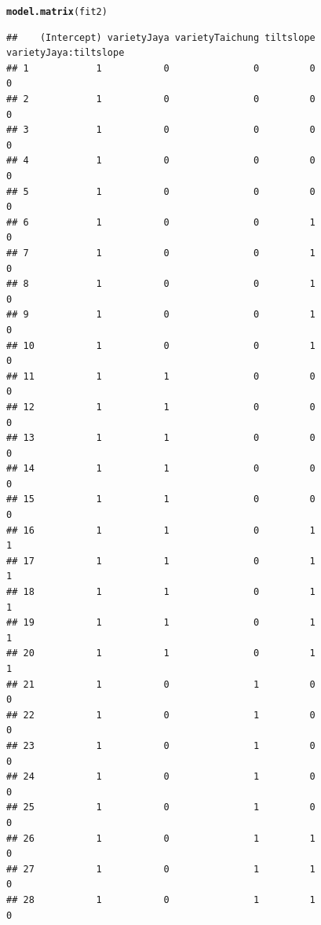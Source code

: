 \documentclass[11pt, a4paper]{article}\usepackage[]{graphicx}\usepackage[dvipsnames]{xcolor}
\makeatletter
\newcommand{\hlstd}[1]{\textcolor[rgb]{0.345,0.345,0.345}{#1}}%
\newcommand{\hlkwd}[1]{\textcolor[rgb]{0.737,0.353,0.396}{\textbf{#1}}}%
\newenvironment{kframe}{%
 \def\at@end@of@kframe{}%
 \ifinner\ifhmode%
  \def\at@end@of@kframe{\end{minipage}}%
  \begin{minipage}{\columnwidth}%
 \fi\fi%
 \def\FrameCommand##1{\hskip\@totalleftmargin \hskip-\fboxsep
 \colorbox{shadecolor}{##1}\hskip-\fboxsep
     \hskip-\linewidth \hskip-\@totalleftmargin \hskip\columnwidth}%
 \MakeFramed {\advance\hsize-\width
   \@totalleftmargin\z@ \linewidth\hsize
   \@setminipage}}%
 {\par\unskip\endMakeFramed%
 \at@end@of@kframe}
\newenvironment{knitrout}{}{} %
\makeatother
\begin{document}
\begin{knitrout}
\color{fgcolor}\begin{kframe}
\begin{alltt}
\hlkwd{model.matrix}\hlstd{(fit2)}
\end{alltt}
\begin{verbatim}
##    (Intercept) varietyJaya varietyTaichung tiltslope varietyJaya:tiltslope
## 1            1           0               0         0                     0
## 2            1           0               0         0                     0
## 3            1           0               0         0                     0
## 4            1           0               0         0                     0
## 5            1           0               0         0                     0
## 6            1           0               0         1                     0
## 7            1           0               0         1                     0
## 8            1           0               0         1                     0
## 9            1           0               0         1                     0
## 10           1           0               0         1                     0
## 11           1           1               0         0                     0
## 12           1           1               0         0                     0
## 13           1           1               0         0                     0
## 14           1           1               0         0                     0
## 15           1           1               0         0                     0
## 16           1           1               0         1                     1
## 17           1           1               0         1                     1
## 18           1           1               0         1                     1
## 19           1           1               0         1                     1
## 20           1           1               0         1                     1
## 21           1           0               1         0                     0
## 22           1           0               1         0                     0
## 23           1           0               1         0                     0
## 24           1           0               1         0                     0
## 25           1           0               1         0                     0
## 26           1           0               1         1                     0
## 27           1           0               1         1                     0
## 28           1           0               1         1                     0

\end{verbatim}
\end{kframe}
\end{knitrout}
\end{document}
